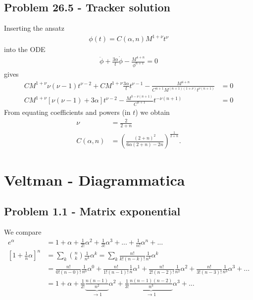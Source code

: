 \documentclass[10pt,a4paper]{book}
\theoremstyle{definition}
\begin{document}
\subsection{Problem 26.5 - Tracker solution}
Inserting the ansatz
\begin{align}
    \phi(t)=C(\alpha,n)M^{1+\nu}t^\nu
\end{align}
into the ODE
\begin{align}
    \ddot\phi+\frac{3\alpha}{t}\dot\phi-\frac{M^{4+n}}{\phi^{n+1}}=0
\end{align}
gives
\begin{align}
    CM^{1+\nu}\nu(\nu-1)t^{\nu-2}+CM^{1+\nu}\frac{3\alpha}{t}t^{\nu-1}-\frac{M^{4+n}}{C^{n+1}M^{(n+1)(1+\nu)}t^{\nu(n+1)}}&=0\\
    CM^{1+\nu}\left[\nu(\nu-1)+3\alpha\right]t^{\nu-2}-\frac{M^{3-\nu(n+1)}}{C^{n+1}}t^{-\nu(n+1)}&=0
\end{align}
From equating coefficients and powers (in $t$) we obtain
\begin{align}
    \nu&=\frac{2}{2+n}\\
    C(\alpha,n)&=\left(\frac{(2+n)^2}{6\alpha(2+n)-2n}\right)^\frac{1}{2+n}.
\end{align}

\newpage
\section{{\sc Veltman} - Diagrammatica}
\subsection{Problem 1.1 - Matrix exponential}
We compare
\begin{align}
e^\alpha&=1+\alpha+\frac{1}{2!}\alpha^2+\frac{1}{3!}\alpha^3+...+\frac{1}{n!}\alpha^n+...\\
\left[1+\frac{1}{n}\alpha\right]^n&=\sum_k \binom{n}{k}\frac{1}{n^k}\alpha^k=\sum_k \frac{n!}{k!(n-k)!}\frac{1}{n^k}\alpha^k\\
&=\frac{n!}{0!(n-0)!}\frac{1}{n^0}\alpha^0+\frac{n!}{1!(n-1)!}\frac{1}{n}\alpha^1+\frac{n!}{2!(n-2)!}\frac{1}{n^2}\alpha^2+\frac{n!}{3!(n-3)!}\frac{1}{n^3}\alpha^3+...\\
&=1+\alpha+\frac{1}{2!}\underbrace{\frac{n(n-1)}{n^2}}_{\rightarrow1}\alpha^2+\frac{1}{3!}\underbrace{\frac{n(n-1)(n-2)}{n^3}}_{\rightarrow1}\alpha^3+...
\end{align}
\end{document}
